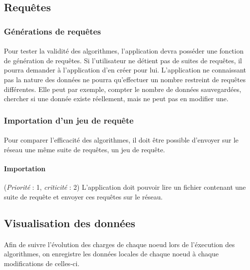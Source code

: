 \documentclass[12pt]{article}
\newcommand{\besoin}[2] {
  (\textit{Priorité} : #1, \textit{criticité} : #2)
}
\begin{document}
\subsection{Requêtes}

\subsubsection{Générations de requêtes}

\paragraph{} Pour tester la validité des algorithmes, l'application devra posséder une fonction de génération de requêtes. Si l'utilisateur ne détient pas de suites de requêtes, il pourra demander à l'application d'en créer pour lui. L'application ne connaissant pas la nature des données ne pourra qu'effectuer un nombre restreint de requêtes différentes. Elle peut par exemple, compter le nombre de données sauvegardées, chercher si une donnée existe réellement, mais ne peut pas en modifier une.


\subsubsection{Importation d'un jeu de requête}

\paragraph{} Pour comparer l'efficacité des algorithmes, il doit être possible d'envoyer sur le réseau une même suite de requêtes, un jeu de requête.

\paragraph{Importation} \besoin{1}{2} L'application doit pouvoir lire un fichier contenant une suite de requête et envoyer ces requêtes sur le réseau.


\subsection{Visualisation des données}

\paragraph{} Afin de suivre l'évolution des charges de chaque noeud lors de l'éxecution des algorithmes, on enregistre les données locales de chaque noeud à chaque modifications de celles-ci.
\end{document}
